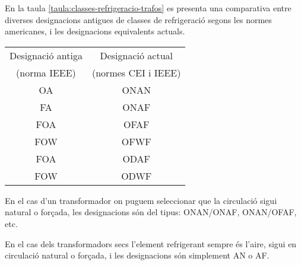 En la taula \vref{taula:classes-refrigeracio-trafos} es presenta una
comparativa entre diverses designacions antigues de classes de
refrigeració segons les normes americanes, i les designacions
equivalents actuals.

\begin{center}
   \label{taula:classes-refrigeracio-trafos}
   \begin{tabular}{cc}
   \toprule[1pt]
   Designació antiga & Designació actual \\
   (norma IEEE)     & (normes CEI i IEEE) \\
   \midrule
   OA & ONAN   \\
   FA & ONAF   \\
   FOA & OFAF  \\
   FOW & OFWF  \\
   FOA & ODAF  \\
   FOW & ODWF \\
   \bottomrule[1pt]
   \end{tabular}
\end{center}

En el cas d'un transformador on puguem seleccionar que la circulació
sigui natural o forçada,
les designacions són del tipus: ONAN/ONAF, ONAN/OFAF, etc.

En el cas dels transformadors secs l'element refrigerant sempre és
l'aire, sigui en circulació natural o forçada, i les
designacions són simplement AN o AF.

